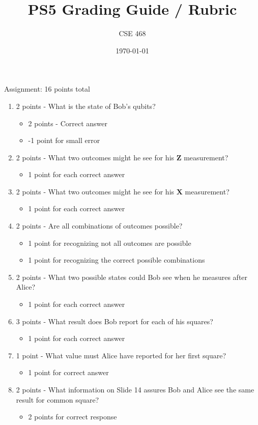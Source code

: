 \documentclass[12pt]{article}
\title{PS5 Grading Guide / Rubric}
\author{CSE 468}
\date{\today}
\begin{document}
\maketitle

Assignment: 16 points total
\begin{enumerate}[font=\bfseries]
    \item 2 points - What is the state of Bob's qubits?
        \begin{itemize}
            \item 2 points - Correct answer
            \item -1 point for small error
        \end{itemize}
    \item 2 points - What two outcomes might he see for his $\mathbf{Z}$ measurement?
        \begin{itemize}
            \item 1 point for each correct answer
        \end{itemize}
    \item 2 points - What two outcomes might he see for his $\mathbf{X}$ measurement?
        \begin{itemize}
            \item 1 point for each correct answer
        \end{itemize}
    \item 2 points - Are all combinations of outcomes possible?
        \begin{itemize}
            \item 1 point for recognizing not all outcomes are possible
            \item 1 point for recognizing the correct possible combinations
        \end{itemize}
    \item 2 points - What two possible states could Bob see when he measures after Alice?
        \begin{itemize}
            \item 1 point for each correct answer
        \end{itemize}
    \item 3 points - What result does Bob report for each of his squares?
        \begin{itemize}
            \item 1 point for each correct answer
        \end{itemize}
    \item 1 point - What value must Alice have reported for her first square?
        \begin{itemize}
            \item 1 point for correct answer
        \end{itemize}
    \item 2 points - What information on Slide 14 assures Bob and Alice see the same result for common square?
        \begin{itemize}
            \item 2 points for correct response
        \end{itemize}
\end{enumerate}
\end{document}
